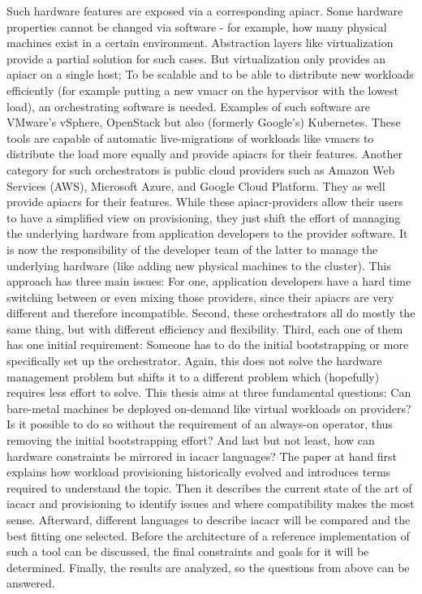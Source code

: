 Such hardware features are exposed via a corresponding \gls{apiacr}. Some hardware properties cannot be changed via software - for example, how many physical machines exist in a certain environment. Abstraction layers like virtualization provide a partial solution for such cases.
\newline
But virtualization only provides an \gls{apiacr} on a single host; To be scalable and to be able to distribute new workloads efficiently (for example putting a new \gls{vmacr} on the hypervisor with the lowest load), an orchestrating software is needed. Examples of such software are VMware's vSphere, OpenStack but also (formerly Google's) Kubernetes.
\newline
These tools are capable of automatic live-migrations of workloads like \gls{vmacr}s to distribute the load more equally and provide \gls{apiacr}s for their features.
\newline
Another category for such orchestrators is public cloud providers such as Amazon Web Services (AWS), Microsoft Azure, and Google Cloud Platform. They as well provide \gls{apiacr}s for their features.
\newline
While these \gls{apiacr}-providers allow their users to have a simplified view on provisioning, they just shift the effort of managing the underlying hardware from application developers to the provider software. It is now the responsibility of the developer team of the latter to manage the underlying hardware (like adding new physical machines to the cluster).
\newline
This approach has three main issues: For one, application developers have a hard time switching between or even mixing those providers, since their \gls{apiacr}s are very different and therefore incompatible. Second, these orchestrators all do mostly the same thing, but with different efficiency and flexibility. Third, each one of them has one initial requirement: Someone has to do the initial bootstrapping or more specifically set up the orchestrator. Again, this does not solve the hardware management problem but shifts it to a different problem which (hopefully) requires less effort to solve.
\newline
This thesis aims at three fundamental questions: Can bare-metal machines be deployed on-demand like virtual workloads on providers? Is it possible to do so without the requirement of an always-on operator, thus removing the initial bootstrapping effort? And last but not least, how can hardware constraints be mirrored in \gls{iacacr} languages?
\newline
The paper at hand first explains how workload provisioning historically evolved and introduces terms required to understand the topic. Then it describes the current state of the art of \gls{iacacr} and provisioning to identify issues and where compatibility makes the most sense. Afterward, different languages to describe \gls{iacacr} will be compared and the best fitting one selected.
Before the architecture of a reference implementation of such a tool can be discussed, the final constraints and goals for it will be determined. Finally, the results are analyzed, so the questions from above can be answered.

